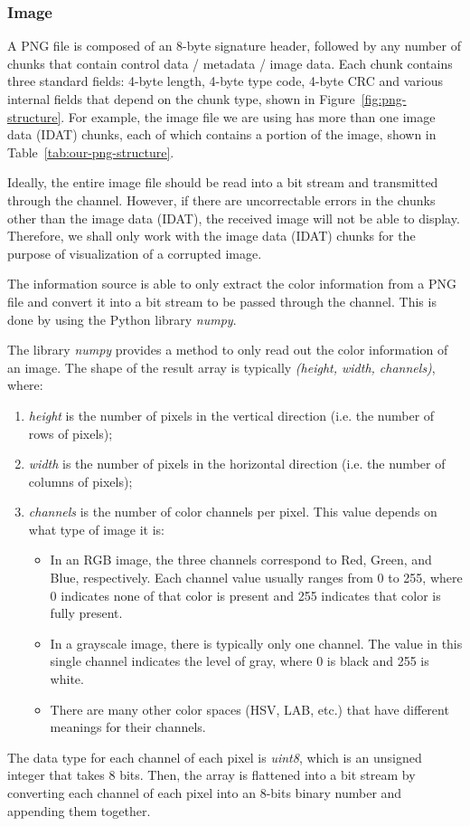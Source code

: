 \documentclass{article}
\begin{document}
\subsubsection{Image}
A PNG file is composed of an 8-byte signature header, followed by any number of chunks that contain control data / metadata / image data. 
Each chunk contains three standard fields: 4-byte length, 4-byte type code, 4-byte CRC and various internal fields that depend on the chunk type, shown in Figure~\ref{fig:png-structure}. 
For example, the image file we are using has more than one image data (IDAT) chunks, each of which contains a portion of the image, shown in Table~\ref{tab:our-png-structure}.

Ideally, the entire image file should be read into a bit stream and transmitted through the channel. 
However, if there are uncorrectable errors in the chunks other than the image data (IDAT), the received image will not be able to display.
Therefore, we shall only work with the image data (IDAT) chunks for the purpose of visualization of a corrupted image.

The information source is able to only extract the color information from a PNG file and convert it into a bit stream to be passed through the channel. 
This is done by using the Python library \textit{numpy}.

The library \textit{numpy} provides a method to only read out the color information of an image. The shape of the result array is typically \textit{(height, width, channels)}, where:
\begin{enumerate}
    \item \textit{height} is the number of pixels in the vertical direction (i.e. the number of rows of pixels);
    \item \textit{width} is the number of pixels in the horizontal direction (i.e. the number of columns of pixels);
    \item \textit{channels} is the number of color channels per pixel. This value depends on what type of image it is: \begin{itemize}
        \item In an RGB image, the three channels correspond to Red, Green, and Blue, respectively. Each channel value usually ranges from 0 to 255, where 0 indicates none of that color is present and 255 indicates that color is fully present.
        \item In a grayscale image, there is typically only one channel. The value in this single channel indicates the level of gray, where 0 is black and 255 is white.
        \item There are many other color spaces (HSV, LAB, etc.) that have different meanings for their channels.
    \end{itemize}
\end{enumerate}
The data type for each channel of each pixel is \textit{uint8}, which is an unsigned integer that takes 8 bits.
Then, the array is flattened into a bit stream by converting each channel of each pixel into an 8-bits binary number and appending them together.
\end{document}
